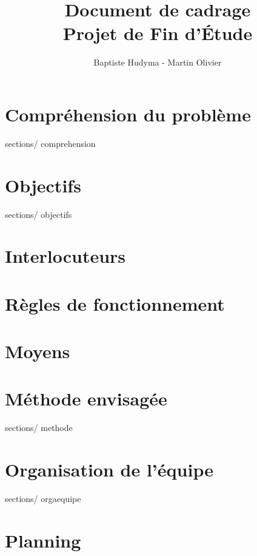 \documentclass[french, 11pt, a4paper]{article}
\begin{document}
\title {Document de cadrage\\Projet de Fin d'Étude}
\author{Baptiste Hudyma - Martin Olivier}

\thispagestyle {plain}

\maketitle
\newpage

\tableofcontents
\newpage

\section {Compréhension du problème}
 {sections/} {comprehension}
\newpage

\section {Objectifs}
 {sections/} {objectifs}
\newpage

\section {Interlocuteurs}

\newpage

\section {Règles de fonctionnement}

\newpage

\section {Moyens}

\newpage

\section {Méthode envisagée}
 {sections/} {methode}
\newpage

\section {Organisation de l'équipe}
 {sections/} {orgaequipe}
\newpage

\section {Planning}

\newpage
\end{document}
